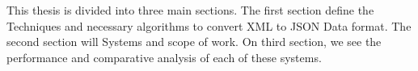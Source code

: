 This thesis is divided into three main sections. The first section define the Techniques and necessary algorithms to convert XML  to JSON Data format. The second section will Systems and scope of work. On third section, we see the performance and comparative analysis of each of these systems.